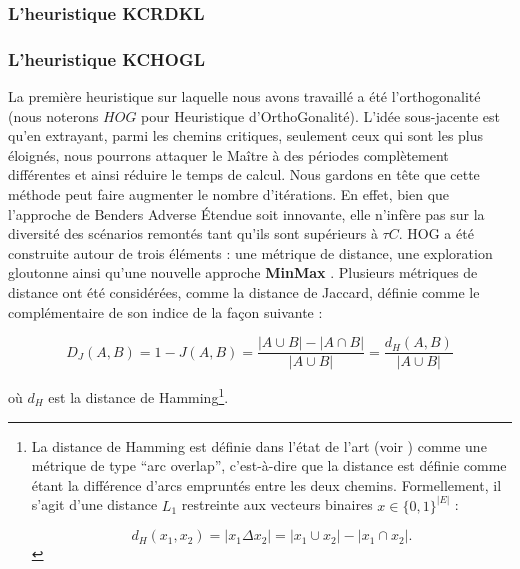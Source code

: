 \documentclass[12pt, a4paper, twoside]{article}
\numberwithin{equation}{section}
\newcommand{\mmx}{\textbf{MinMax} }
\begin{document}
    \subsubsection{L'heuristique KCRDKL}
    

    
	\subsubsection{L'heuristique KCHOGL}
	
	La première heuristique sur laquelle nous avons travaillé a été l'orthogonalité (nous noterons $HOG$ pour Heuristique d'OrthoGonalité).
	L'idée sous-jacente est qu'en extrayant, parmi les chemins critiques, seulement ceux qui sont les plus éloignés, nous pourrons attaquer le Maître à des périodes complètement différentes et ainsi réduire le temps de calcul. Nous gardons en tête que cette méthode peut faire augmenter le nombre d'itérations. En effet, bien que l'approche de  Benders Adverse Étendue soit innovante, elle n'infère pas sur la diversité des scénarios remontés tant qu'ils sont supérieurs à $\tau C$.
	HOG a été construite autour de trois éléments : une métrique de distance, une exploration gloutonne ainsi qu'une nouvelle approche \mmx. Plusieurs métriques de distance ont été considérées, comme la distance de Jaccard, définie comme le complémentaire de son indice de la façon suivante :
	
	\begin{equation}
		D_J(A, B)
		= 1 - J(A, B)
		= \frac{|A \cup B| - |A \cap B|}{|A \cup B|}
		= \frac{d_H(A, B)}{|A \cup B|}
	\end{equation}
	
	\noindent où \(d_H\) est la distance de Hamming\footnote{La distance de Hamming est définie dans l'état de l'art (voir \cite{hamming_dist_scheduling_prbl}) comme une métrique de type \enquote{arc overlap}, c'est-à-dire que la distance est définie comme étant la différence d'arcs empruntés entre les deux chemins. Formellement, il s'agit d'une distance $L_1$ restreinte aux vecteurs binaires $x\in\{0, 1\}^{|E|}$ :
		
		\[
		d_H(x_1,x_2)=|x_1\Delta x_2|=|x_1\cup x_2|-|x_1\cap x_2|.
		\]
	}.
	
\end{document}
